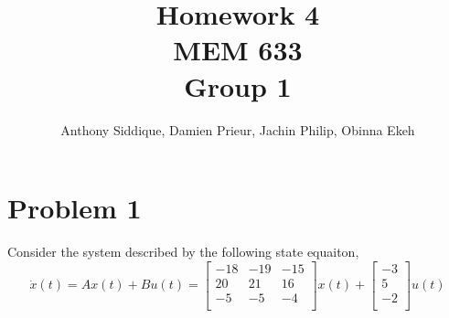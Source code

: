 \documentclass{article}
\author{Anthony Siddique, Damien Prieur, Jachin Philip, Obinna Ekeh}
\title{Homework 4\\ MEM 633 \\ Group 1}
\date{}
\begin{document}
\maketitle

\section*{Problem 1}
Consider the system described by the following state equaiton,
$$
\dot{x}(t) = Ax(t) + Bu(t) =
\begin{bmatrix}
-18 & -19 & -15 \\
20 & 21 & 16 \\
-5 & -5 & -4 \\
\end{bmatrix}
x(t)
+
\begin{bmatrix}
-3 \\
 5 \\
-2 \\
\end{bmatrix}
u(t)
$$
\end{document}
